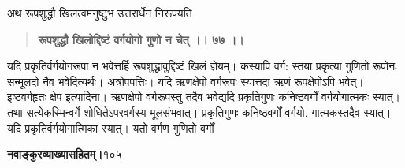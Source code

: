 \documentclass[11pt, openany]{book}
\begin{document}
\begin{sloppypar}
\hangindent=0.2in \hspace{0.2in}अथ रूपशुद्धौ खिलत्वमनुष्टुभ उत्तरार्धेन निरूपयति\textendash

\begin{quote}
\hspace{0.5in}\textbf{रूपशुद्धौ खिलोद्दिष्टं वर्गयोगो गुणो न चेत् ।। ७७ ।।}
\end{quote}

\hangindent=0.2in \hspace{0.2in}यदि प्रकृतिर्वर्गयोगरूपा न भवेत्तर्हि रूपशुद्धावुद्दिष्टं खिलं ज्ञेयम्। कस्यापि वर्ग: स्तया प्रकृत्या गुणितो रूपोनः सन्मूलदो नैव भवेदित्यर्थः। अत्रोपपत्तिः। यदि ऋणक्षेपो वर्गरूपः स्यात्तदा ऋणं रूपक्षेपोऽपि भवेत्। इष्टवर्गहृतः क्षेप इत्यादिना। ऋणक्षेपो वर्गरूपस्तु तदैव भवेद्यदि प्रकृतिगुणः कनिष्ठवर्गों वर्गयोगात्मकः स्यात्। तथा सत्येकस्मिन्वर्गे शोधितेऽपरवर्गस्य मूलसंभवात्। प्रकृतिगुणः कनिष्ठवर्गों वर्गयो. गात्मकस्तदैव स्यात्। यदि प्रकृतिर्वर्गयोगात्मिका स्यात्। यतो वर्गण गुणितो वर्गों
\end{sloppypar}
\thispagestyle{empty}
\newpage

\onehalfspacing
\hspace{2in}\textbf{नवाङ्कुरव्याख्यासहितम्।}\hspace{2in}१०५
\end{document}
